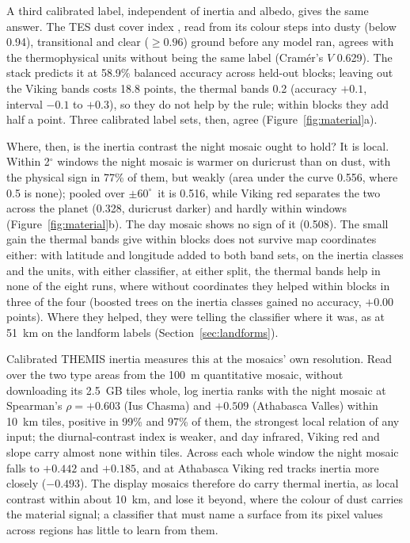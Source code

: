 \documentclass[twocolumn]{aastex701}
\newcommand{\pmsixty}{$\pm60^{\circ}$}
\begin{document}
A third calibrated label, independent of inertia and albedo, gives the same answer. The TES dust cover index
\citep{Ruff2002}, read from its colour steps into dusty (below 0.94), transitional and clear ($\ge0.96$) ground
before any model ran, agrees with the thermophysical units without being the same label (Cram\'er's $V$ 0.629). The
stack predicts it at 58.9\% balanced accuracy across held-out blocks; leaving out the Viking bands costs 18.8
points, the thermal bands 0.2 (accuracy $+0.1$, interval $-0.1$ to $+0.3$), so they do not help by the rule; within
blocks they add half a point. Three calibrated label sets, then, agree (Figure~\ref{fig:material}a).

Where, then, is the inertia contrast the night mosaic ought to hold? It is local. Within 2$^{\circ}$ windows the night
mosaic is warmer on duricrust than on dust, with the physical sign in 77\% of them, but weakly (area under the curve
0.556, where 0.5 is none); pooled over \pmsixty\ it is 0.516, while Viking red separates the two across the planet
(0.328, duricrust darker) and hardly within windows (Figure~\ref{fig:material}b). The day mosaic shows no sign of it
(0.508). The small gain the thermal bands give within blocks does not survive map coordinates either: with latitude
and longitude added to both band sets, on the inertia classes and the units, with either classifier, at either split,
the thermal bands help in none of the eight runs, where without coordinates they helped within blocks in three of
the four (boosted trees on the inertia classes gained no accuracy, $+0.00$ points). Where they helped, they were
telling the classifier where it was, as at 51~km on the landform labels (Section~\ref{sec:landforms}). %

Calibrated THEMIS inertia \citep{Fergason2006} measures this at the mosaics' own resolution. Read over the two type
areas from the 100~m quantitative mosaic, without downloading its 2.5~GB tiles whole, log inertia ranks with the night
mosaic at Spearman's $\rho=+0.603$ (Ius Chasma) and $+0.509$ (Athabasca Valles) within 10~km tiles, positive in 99\%
and 97\% of them, the strongest local relation of any input; the diurnal-contrast index is weaker, and day infrared,
Viking red and slope carry almost none within tiles. Across each whole window the night mosaic falls to $+0.442$ and
$+0.185$, and at Athabasca Viking red tracks inertia more closely ($-0.493$). The display mosaics therefore do carry
thermal inertia, as local contrast within about 10~km, and lose it beyond, where the colour of dust carries the
material signal; a classifier that must name a surface from its pixel values across regions has little to learn from
them. %
\end{document}
